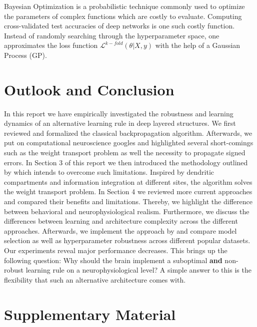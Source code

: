 \documentclass[colorinlistoftodos]{article}
\theoremstyle{definition}
\newcommand{\rob}[1]{\todo[color=red!40]{Rob: #1}}
\begin{document}
Bayesian Optimization \rob{Add BO classic reference} is a probabilistic technique commonly used to optimize the parameters of complex functions which are costly to evaluate. Computing cross-validated test accuracies of deep networks is one such costly function. Instead of randomly searching through the hyperparameter space, one approximates the loss function $\mathcal{L}^{k-fold}(\theta|X, y)$ with the help of a Gaussian Process (GP).

\newpage
\section{Outlook and Conclusion}

In this report we have empirically investigated the robustness and learning dynamics of an alternative learning rule in deep layered structures.
We first reviewed and formalized the classical backpropagation algorithm. Afterwards, we put on computational neuroscience googles and highlighted several short-comings such as the weight transport problem as well the necessity to propagate signed errors.
In Section 3 of this report we then introduced the methodology outlined by \citet{guerguiev2017} which intends to overcome such limitations. Inspired by dendritic compartments and information integration at different sites, the algorithm solves the weight transport problem.
In Section 4 we reviewed more current approaches and compared their benefits and limitations. Thereby, we highlight the difference between behavioral and neurophysiological realism. Furthermore, we discuss the differences between learning and architecture complexity across the different approaches. 
Afterwards, we implement the approach by \citet{guerguiev2017} and compare model selection as well as hyperparameter robustness across different popular datasets. Our experiments reveal major performance decreases. This brings up the following question: Why should the brain implement a suboptimal \textbf{and} non-robust learning rule on a neurophysiological level? A simple answer to this is the flexibility that such an alternative architecture comes with.



\setlength{\bibsep}{4pt plus 0.3ex}

{\footnotesize }

\newpage
\section*{Supplementary Material}


\end{document}
